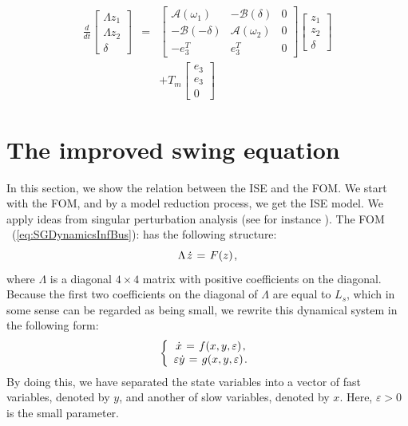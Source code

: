 \documentclass[conference]{IEEEtran}
\newcommand{\rfb}[1]{\mbox{\rm
   (\ref{#1})}\ifx\undefined\stillediting\else:\fbox{$#1$}\fi}
\newcommand{\e}      {{\varepsilon}}
\newcommand{\m}      {{\hbox{\hskip 1pt}}}
\begin{document}
\begin{equation}
\begin{array}{ccc}
\frac{d}{dt}\left[\begin{array}{c}
\varLambda z_{1}\\
\varLambda z_{2}\\
\delta
\end{array}\right] & = & \left[\begin{array}{c|c|c}
\mathcal{A}(\omega_{1}) & -\mathcal{B}(\delta) & 0\\
\hline -\mathcal{B}(-\delta) & \mathcal{A}(\omega_{2}) & 0\\
\hline -e_{3}^{T} & e_{3}^{T} & 0
\end{array}\right]\left[\begin{array}{c}
z_{1}\\
z_{2}\\
\delta
\end{array}\right]\\
 &  & +T_{m}\left[\begin{array}{c}
e_{3}\\
e_{3}\\
0
\end{array}\right]
\end{array}\label{eq:TICSGDynamics}
\end{equation}

\section{The improved swing equation}

In this section, we show the relation between the ISE and the FOM. We
start with the FOM, and by a model reduction process, we get the ISE
model.  We apply ideas from singular perturbation analysis (see for
instance \cite{Khalil}). The FOM \rfb{eq:SGDynamicsInfBus} has the
following structure: \vspace{-2mm}
$$\Lambda \m \dot{z} \m=\m F(z) \m,$$ 
where $\Lambda$ is a diagonal $4\times 4$ matrix with positive
coefficients on the diagonal. Because the first two coefficients on
the diagonal of $\Lambda$ are equal to $L_s$, which in some sense can
be regarded as being small, we rewrite this dynamical system in the
following form:
$$ \left\{ \begin{array}{c} \dot{x} \m=\m f(x,y,\e) \m,\\
   \e\dot{y} \m=\m g(x,y,\e) \m. \end{array}\right.$$
By doing this, we have separated the state variables into a vector of 
fast variables, denoted by $y$, and another of slow variables, denoted
by $x$. Here, $\e>0$ is the small parameter.
\end{document}
